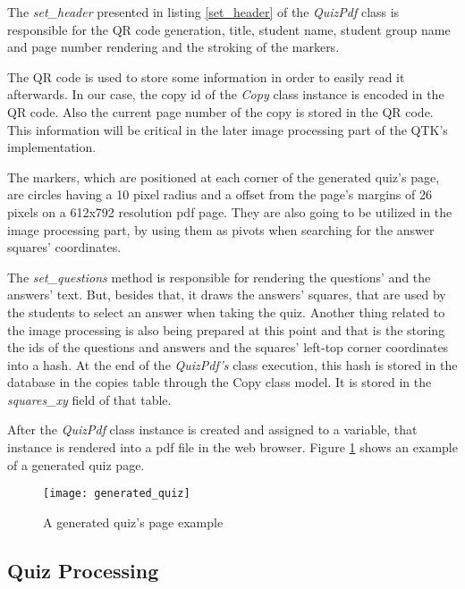 The \textit{set\_header} presented in listing \ref{set_header} of the \textit{QuizPdf} class is responsible for the QR code generation, title, student name, student group name and page number rendering and the stroking of the markers. 




The QR code is used to store some information in order to easily read it afterwards. In our case, the copy id of the \textit{Copy} class instance 
is encoded in the QR code. Also the current page number of the copy is stored in the QR code. This information will be critical in the later image processing part of the QTK's implementation. 

The markers, which are positioned at each corner of the generated quiz's page, are circles having a 10 pixel radius and a offset from the page's margins of 26 pixels on a 612x792 resolution pdf page. They are also going to be utilized in the image processing part, by using them as pivots when searching for the answer squares' coordinates.

The \textit{set\_questions} method is responsible for rendering the questions' and the answers' text. But, besides that, it draws the answers' squares, that are used by the students to select an answer when taking the quiz. Another thing related to the image processing is also being prepared at this point and that is the storing the ids of the questions and answers and the squares' left-top corner coordinates into a hash. At the end of the \textit{QuizPdf's} class execution, this hash is stored in the database in the copies table through the Copy class model. It is stored in the \textit{squares\_xy} field of that table.

After the \textit{QuizPdf} class instance is created and assigned to a variable, that instance is rendered into a pdf file in the web browser. Figure \ref{generated_quiz_page} shows an example of a generated quiz page. 

\begin{figure}[!ht]
\centering
\texttt{[image: generated\_quiz]}
\caption{A generated quiz's page example}\label{generated_quiz_page}
\end{figure}


\subsection{Quiz Processing}

